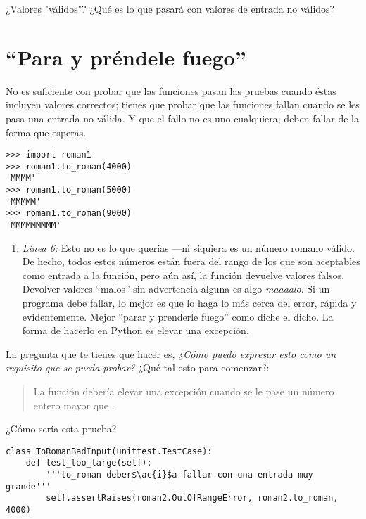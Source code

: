 ¿Valores "válidos"? ¿Qué es lo que pasará con valores de entrada no válidos?


\section{``Para y préndele fuego''}


No es suficiente con probar que las funciones pasan las pruebas cuando éstas incluyen valores correctos; tienes que probar que las funciones fallan cuando se les pasa una entrada no válida. Y que el fallo no es uno cualquiera; deben fallar de la forma que esperas.

\noindent\begin{minipage}{\textwidth}
\begin{lstlisting}[mathescape=True]
>>> import roman1
>>> roman1.to_roman(4000)
'MMMM'
>>> roman1.to_roman(5000)
'MMMMM'
>>> roman1.to_roman(9000)
'MMMMMMMMM'
\end{lstlisting}
\end{minipage}

\begin{enumerate}

\item \emph{Línea 6:} Esto no es lo que querías ---ni siquiera es un número romano válido. De hecho, todos estos números están fuera del rango de los que son aceptables como entrada a la función, pero aún así, la función devuelve valores falsos. Devolver valores ``malos'' sin advertencia alguna es algo \emph{maaaalo}. Si un programa debe fallar, lo mejor es que lo haga lo más cerca del error, rápida y evidentemente. Mejor ``parar y prenderle fuego'' como diche el dicho. La forma de hacerlo en Python es elevar una excepción.

\end{enumerate}

La pregunta que te tienes que hacer es, \emph{¿Cómo puedo expresar esto como un requisito que se pueda probar?} ¿Qué tal esto para comenzar?:

\begin{quote}
La función  debería elevar una excepción  cuando se le pase un número entero mayor que .
\end{quote}

¿Cómo sería esta prueba?

\noindent\begin{minipage}{\textwidth}
\begin{lstlisting}[mathescape=True]
class ToRomanBadInput(unittest.TestCase):
    def test_too_large(self):
        '''to_roman deber$\ac{i}$a fallar con una entrada muy grande'''
        self.assertRaises(roman2.OutOfRangeError, roman2.to_roman, 4000)
\end{lstlisting}
\end{minipage}

